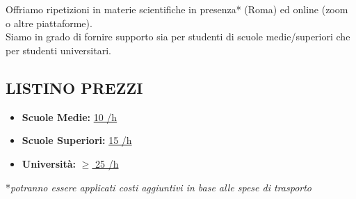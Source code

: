 \section*{\scalebox{1.5}{RIPETIZIONI}}
Offriamo ripetizioni in materie scientifiche in presenza* (Roma) ed online (zoom o altre piattaforme).\\
Siamo in grado di fornire supporto sia per studenti di scuole medie/superiori che per studenti universitari.
\subsection*{\textbf{LISTINO PREZZI}}
\begin{itemize}
\item \textbf{Scuole Medie:} \underline{10 \EUR /h}\\
\item \textbf{Scuole Superiori:} \underline{15 \EUR/h}\\
\item \textbf{Università:} \underline{$\ge$ 25 \EUR/h}
\end{itemize}
*\textit{potranno essere applicati costi aggiuntivi in base alle spese di trasporto}